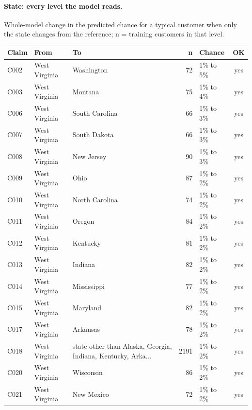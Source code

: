 \documentclass[a4paper,10pt]{article}
\newif\ifreviewmarks
\newcommand{\reviewrule}{\noindent{\color{BrickRed}\rule{\linewidth}{0.8pt}}}
\newenvironment{drafted}[1][]{%
  \ifreviewmarks\par\addvspace{\medskipamount}\reviewrule\par\nopagebreak
  \noindent{\color{BrickRed}\sffamily\footnotesize\textbf{Thesis Draft}\quad #1\hfill review}\par\nopagebreak\smallskip\fi}{%
  \ifreviewmarks\par\smallskip\noindent{\color{BrickRed}\sffamily\footnotesize end of thesis draft}\par\nopagebreak\reviewrule\par\medskip\fi}
\begin{document}
\begin{drafted}[plain-language layer: churn100-s7-c1]
\paragraph{State: every level the model reads.} Whole-model change in the predicted chance for a typical customer when only the state changes from the reference; n = training customers in that level.\par\smallskip
{\scriptsize{}
\begin{longtable}{@{}lllrlc@{}}
\toprule\rowcolor{white}
Claim & From & To & n & Chance & OK \\
\midrule\endhead
\bottomrule\endfoot
C002 & West Virginia & Washington & 72 & 1\% to 5\% & \textcolor{OliveGreen}{yes} \\
C003 & West Virginia & Montana & 75 & 1\% to 4\% & \textcolor{OliveGreen}{yes} \\
C006 & West Virginia & South Carolina & 66 & 1\% to 3\% & \textcolor{OliveGreen}{yes} \\
C007 & West Virginia & South Dakota & 66 & 1\% to 3\% & \textcolor{OliveGreen}{yes} \\
C008 & West Virginia & New Jersey & 90 & 1\% to 3\% & \textcolor{OliveGreen}{yes} \\
C009 & West Virginia & Ohio & 87 & 1\% to 2\% & \textcolor{OliveGreen}{yes} \\
C010 & West Virginia & North Carolina & 74 & 1\% to 2\% & \textcolor{OliveGreen}{yes} \\
C011 & West Virginia & Oregon & 84 & 1\% to 2\% & \textcolor{OliveGreen}{yes} \\
C012 & West Virginia & Kentucky & 81 & 1\% to 2\% & \textcolor{OliveGreen}{yes} \\
C013 & West Virginia & Indiana & 82 & 1\% to 2\% & \textcolor{OliveGreen}{yes} \\
C014 & West Virginia & Mississippi & 77 & 1\% to 2\% & \textcolor{OliveGreen}{yes} \\
C015 & West Virginia & Maryland & 82 & 1\% to 2\% & \textcolor{OliveGreen}{yes} \\
C017 & West Virginia & Arkansas & 78 & 1\% to 2\% & \textcolor{OliveGreen}{yes} \\
C018 & West Virginia & state other than Alaska, Georgia, Indiana, Kentucky, Arka... & 2191 & 1\% to 2\% & \textcolor{OliveGreen}{yes} \\
C020 & West Virginia & Wisconsin & 86 & 1\% to 2\% & \textcolor{OliveGreen}{yes} \\
C021 & West Virginia & New Mexico & 72 & 1\% to 2\% & \textcolor{OliveGreen}{yes} \\

\end{longtable}}
\end{drafted}
\end{document}
